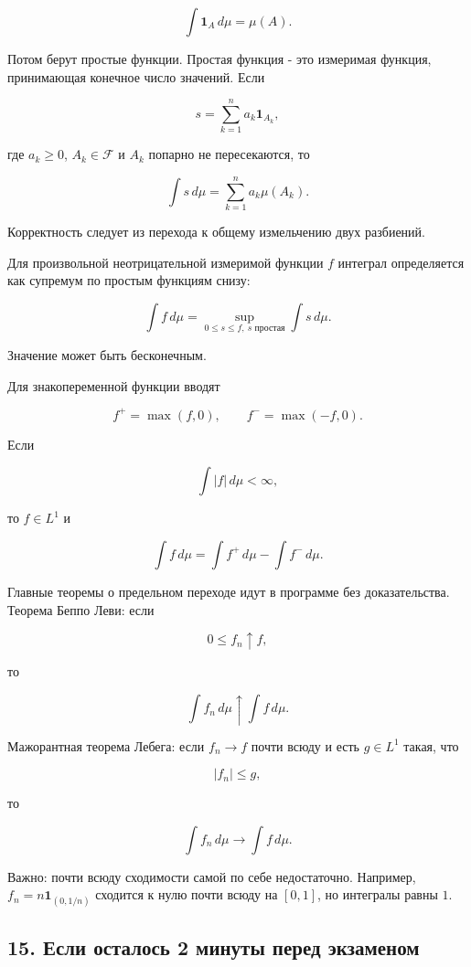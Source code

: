 \documentclass[
  11pt,
  a4paper,
]{article}
\begin{document}
\[
\int\mathbf 1_A\,d\mu=\mu(A).
\]

Потом берут простые функции. Простая функция - это измеримая функция,
принимающая конечное число значений. Если

\[
s=\sum_{k=1}^n a_k\mathbf 1_{A_k},
\]

где \(a_k\ge0\), \(A_k\in\mathcal F\) и \(A_k\) попарно не пересекаются,
то

\[
\int s\,d\mu=\sum_{k=1}^n a_k\mu(A_k).
\]

Корректность следует из перехода к общему измельчению двух разбиений.

Для произвольной неотрицательной измеримой функции \(f\) интеграл
определяется как супремум по простым функциям снизу:

\[
\int f\,d\mu
=
\sup_{0\le s\le f,\ s\text{ простая}}
\int s\,d\mu.
\]

Значение может быть бесконечным.

Для знакопеременной функции вводят

\[
f^+=\max(f,0),\qquad f^-=\max(-f,0).
\]

Если

\[
\int |f|\,d\mu<\infty,
\]

то \(f\in L^1\) и

\[
\int f\,d\mu=\int f^+\,d\mu-\int f^-\,d\mu.
\]

Главные теоремы о предельном переходе идут в программе без
доказательства. Теорема Беппо Леви: если

\[
0\le f_n\uparrow f,
\]

то

\[
\int f_n\,d\mu\uparrow\int f\,d\mu.
\]

Мажорантная теорема Лебега: если \(f_n\to f\) почти всюду и есть
\(g\in L^1\) такая, что

\[
|f_n|\le g,
\]

то

\[
\int f_n\,d\mu\to\int f\,d\mu.
\]

Важно: почти всюду сходимости самой по себе недостаточно. Например,
\(f_n=n\mathbf 1_{(0,1/n)}\) сходится к нулю почти всюду на \([0,1]\),
но интегралы равны \(1\).

\subsection{15. Если осталось 2 минуты перед
экзаменом}\label{ux435ux441ux43bux438-ux43eux441ux442ux430ux43bux43eux441ux44c-2-ux43cux438ux43dux443ux442ux44b-ux43fux435ux440ux435ux434-ux44dux43aux437ux430ux43cux435ux43dux43eux43c}
\end{document}
